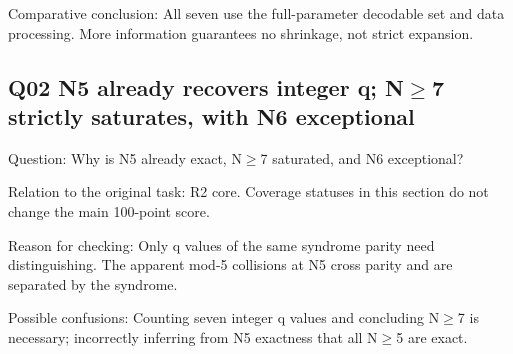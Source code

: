 \documentclass[11pt,a4paper]{article}
\begin{document}
Comparative conclusion: All seven use the full-parameter decodable set and data processing. More information guarantees no shrinkage,\allowbreak{} not strict expansion.

\clearpage
\subsection{Q02 N5 already recovers integer q; N\ensuremath{\geq}7 strictly saturates,\allowbreak{} with N6 exceptional}
\label{aspect:Q02}
Question: Why is N5 already exact,\allowbreak{} N\ensuremath{\geq}7 saturated,\allowbreak{} and N6 exceptional?

Relation to the original task: R2 core. Coverage statuses in this section do not change the main 100-point score.

Reason for checking: Only q values of the same syndrome parity need distinguishing. The apparent mod-5 collisions at N5 cross parity and are separated by the syndrome.

Possible confusions: Counting seven integer q values and concluding N\ensuremath{\geq}7 is necessary; incorrectly inferring from N5 exactness that all N\ensuremath{\geq}5 are exact.
\end{document}
